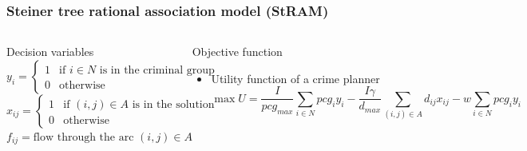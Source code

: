 \documentclass[aspectratio=169]{beamer}
\begin{document}
\begin{frame}
\frametitle{Steiner tree rational association model (StRAM)}
\begin{columns}
  \column{\textwidth}
    \begin{block}{Decision variables}
    \footnotesize
      \vspace{1em}
      $y_{i} =
        \begin{cases}
          1 & \text{if $i \in N$ is in the criminal group}\\
          0 & \text{otherwise}
        \end{cases}$\\
      $x_{ij} =
        \begin{cases}
          1 & \text{if $(i,j) \in A$ is in the solution}\\
          0 & \text{otherwise}
        \end{cases}$\\
      $f_{ij} = \text{flow through the arc $(i,j) \in A$}$
    \end{block}
  \begin{block}{Objective function}
    \begin{itemize}
    \footnotesize
      \item Utility function of a crime planner
      \begin{equation*}
        \max U = \frac{I}{pcg_{max}} \sum_{i \in N} pcg_i y_i - \frac{I \gamma}{d_{max}} \sum_{(i,j) \in A} d_{ij} x_{ij} - w \sum_{i \in N} pcg_i y_i
      \end{equation*}
    \end{itemize}
  \end{block}
  \end{columns}
\end{frame}
\end{document}
